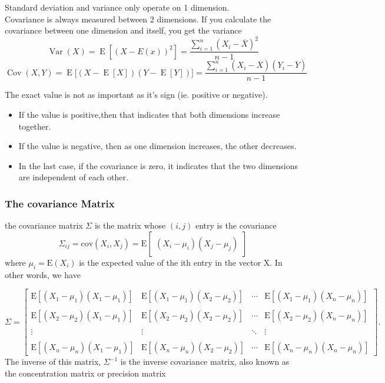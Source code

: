 \documentclass{article}
\begin{document}
Standard deviation and variance only operate on 1 dimension.\\
Covariance is always measured between 2 dimensions. If you calculate the covariance between one dimension and itself, you get the variance
$$ \operatorname{Var}(X) = \operatorname{E}\left[(X - E(x))^2 \right] = \dfrac{\sum_{i=1}^n (X_i - \overline{X})^2}{n-1} $$
$$ \operatorname{Cov}(X,Y) = \operatorname{E}{\big[(X - \operatorname{E}[X])(Y - \operatorname{E}[Y])\big]} =  \dfrac{\sum_{i=1}^n (X_i - \overline{X})(Y_i - \overline{Y})}{n-1} $$

The exact value is not as important as it's sign (ie. positive or negative).
\begin{itemize}
\item If the value is positive,then that indicates that both dimensions increase together.
\item If the value is negative, then as one dimension increases, the other decreases.
\item In the last case, if the covariance is zero, it indicates that the two dimensions are independent of each other.
\end{itemize}

\subsubsection{The covariance Matrix}
the covariance matrix $\Sigma$ is the matrix whose $(i, j)$ entry is the covariance
$$
\Sigma_{ij}
= \mathrm{cov}(X_i, X_j) = \mathrm{E}\begin{bmatrix}
(X_i - \mu_i)(X_j - \mu_j)
\end{bmatrix}
$$
where $\mu_i = \mathrm{E}(X_i)$ is the expected value of the ith entry in the vector X. In other words, we have

$$
\Sigma
= \begin{bmatrix}
 \mathrm{E}[(X_1 - \mu_1)(X_1 - \mu_1)] & \mathrm{E}[(X_1 - \mu_1)(X_2 - \mu_2)] & \cdots & \mathrm{E}[(X_1 - \mu_1)(X_n - \mu_n)] \\ \\
 \mathrm{E}[(X_2 - \mu_2)(X_1 - \mu_1)] & \mathrm{E}[(X_2 - \mu_2)(X_2 - \mu_2)] & \cdots & \mathrm{E}[(X_2 - \mu_2)(X_n - \mu_n)] \\ \\
 \vdots & \vdots & \ddots & \vdots \\ \\
 \mathrm{E}[(X_n - \mu_n)(X_1 - \mu_1)] & \mathrm{E}[(X_n - \mu_n)(X_2 - \mu_2)] & \cdots & \mathrm{E}[(X_n - \mu_n)(X_n - \mu_n)]
\end{bmatrix}.
$$
The inverse of this matrix, $\Sigma^{-1}$ is the inverse covariance matrix, also known as the concentration matrix or precision matrix
\end{document}
